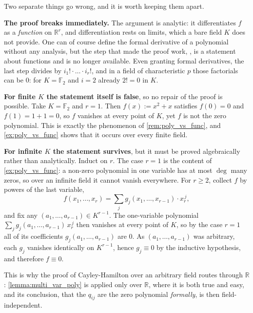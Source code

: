 \begin{exercisesolution}
\label{sol:multi_var_other_fields}
  Two separate things go wrong, and it is worth keeping them apart.

  \textbf{The proof breaks immediately.} The argument is analytic: it differentiates $f$ as a \emph{function} on $\mathbb{R}^r$, and differentiation rests on limits, which a bare field $K$ does not provide. One can of course define the formal derivative of a polynomial without any analysis, but the step that made the proof work, , is a statement about functions and is no longer available. Even granting formal derivatives, the last step divides by $i_1! \cdot \dots \cdot i_r!$, and in a field of characteristic $p$ those factorials can be $0$: for $K = \mathbb{F}_2$ and $i = 2$ already $2! = 0$ in $K$.

  \textbf{For finite $K$ the statement itself is false}, so no repair of the proof is possible. Take $K = \mathbb{F}_2$ and $r = 1$. Then $f(x) := x^2 + x$ satisfies $f(0) = 0$ and $f(1) = 1 + 1 = 0$, so $f$ vanishes at every point of $K$, yet $f$ is not the zero polynomial. This is exactly the phenomenon of \cref{rem:poly_vs_func}, and \cref{ex:poly_vs_func} shows that it occurs over every finite field.

  \textbf{For infinite $K$ the statement survives}, but it must be proved algebraically rather than analytically. Induct on $r$. The case $r = 1$ is the content of \cref{ex:poly_vs_func}: a non-zero polynomial in one variable has at most $\deg$ many zeros, so over an infinite field it cannot vanish everywhere. For $r \ge 2$, collect $f$ by powers of the last variable,
  \[ f(x_1, \dots, x_r) = \sum_{j} g_j(x_1, \dots, x_{r-1}) \cdot x_r^{\,j}, \]
  and fix any $(a_1, \dots, a_{r-1}) \in K^{r-1}$. The one-variable polynomial $\sum_j g_j(a_1, \dots, a_{r-1}) \, x_r^{\,j}$ then vanishes at every point of $K$, so by the case $r = 1$ all of its coefficients $g_j(a_1, \dots, a_{r-1})$ are $0$. As $(a_1, \dots, a_{r-1})$ was arbitrary, each $g_j$ vanishes identically on $K^{r-1}$, hence $g_j \equiv 0$ by the inductive hypothesis, and therefore $f \equiv 0$.

  This is why the proof of Cayley-Hamilton over an arbitrary field routes through $\mathbb{R}$: \cref{lemma:multi_var_poly} is applied only over $\mathbb{R}$, where it is both true and easy, and its conclusion, that the $q_{ij}$ are the zero polynomial \emph{formally}, is then field-independent.
\end{exercisesolution}

